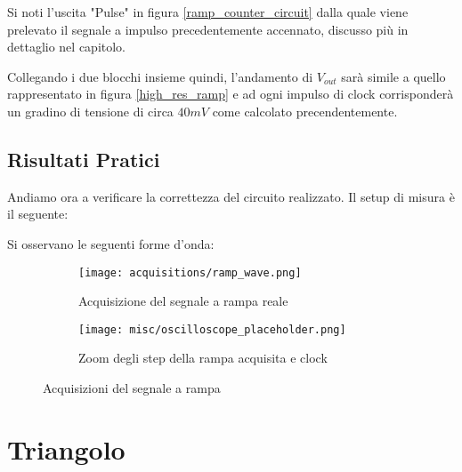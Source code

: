 Si noti l'uscita "Pulse" in figura \ref{ramp_counter_circuit} dalla quale viene prelevato
il segnale a impulso precedentemente accennato, discusso più in dettaglio nel capitolo.

Collegando i due blocchi insieme quindi, l'andamento di $V_{out}$ sarà simile a quello
rappresentato in figura \ref{high_res_ramp} e ad ogni impulso di clock corrisponderà un
gradino di tensione di circa $40mV$ come calcolato precendentemente.


\subsection*{Risultati Pratici}


Andiamo ora a verificare la correttezza del circuito realizzato. Il setup di misura è il
seguente:
\medskip


Si osservano le seguenti forme d'onda:
\medskip

\begin{figure}[ht]
    \centering

    \begin{subfigure}{.5\textwidth}
        \centering
        \texttt{[image: acquisitions/ramp\_wave.png]}
        \caption{Acquisizione del segnale a rampa reale}
        \label{acq_ramp}
    \end{subfigure}%
    \begin{subfigure}{.5\textwidth}
        \centering
        \texttt{[image: misc/oscilloscope\_placeholder.png]}
        \caption{Zoom degli step della rampa acquisita e clock}
        \label{acq_ramp_steps}
    \end{subfigure}

    \caption{Acquisizioni del segnale a rampa}
    \label{acq_ramp_signals}
\end{figure}


\section{Triangolo}

